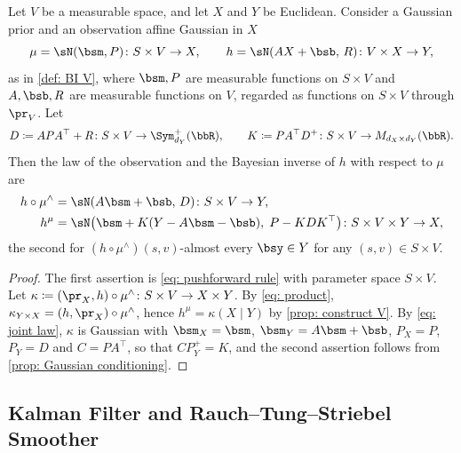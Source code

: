 \documentclass[12pt,reqno]{amsart}%
\theoremstyle{plain}
\theoremstyle{definition}
\def\R{\bbR}
\begin{document}
\begin{corollary}\label{cor: Gaussian BI}
	Let $V$ be a measurable space, and let $X$ and $Y$ be Euclidean.
	Consider a Gaussian prior and an observation affine Gaussian in $X$
	\[
		\mu=\sN(\bsm,P)\colon S\times V\rightarrow X,\qquad
		h=\sN(AX+\bsb,\,R)\colon V\times X\rightarrow Y,
	\]
	as in \cref{def: BI V}, where $\bsm,P$ are measurable functions on $S\times V$
	and $A,\bsb,R$ are measurable functions on $V$, regarded as functions on $S\times V$ through $\pr_V$.
	Let
	\[
		D\coloneqq APA^{\top}+R\colon S\times V\rightarrow\Sym^+_{d_Y}(\R),\qquad
		K\coloneqq PA^{\top}D^+\colon S\times V\rightarrow M_{d_X\times d_Y}(\R).
	\]
	Then the law of the observation and the Bayesian inverse of $h$ with respect to $\mu$ are
	\begin{align*}
		h\circ\mu^\wedge&=\sN(A\bsm+\bsb,\,D)\colon S\times V\rightarrow Y,\\
		h^\mu&=\sN\bigl(\bsm+K(Y-A\bsm-\bsb),\;P-KDK^{\top}\bigr)\colon S\times V\times Y\rightarrow X,
	\end{align*}
	the second for $(h\circ\mu^\wedge)(s,v)$-almost every $\bsy\in Y$ for any $(s,v)\in S\times V$.
\end{corollary}

\begin{proof}
	The first assertion is \eqref{eq: pushforward rule} with parameter space $S\times V$.
	Let $\kappa\coloneqq(\pr_X,h)\circ\mu^\wedge\colon S\times V\rightarrow X\times Y$.
	By \eqref{eq: product}, $\kappa_{Y\times X}=(h,\pr_X)\circ\mu^\wedge$, hence $h^\mu=\kappa(X\mid Y)$ by \cref{prop: construct V}.
	By \eqref{eq: joint law}, $\kappa$ is Gaussian with $\bsm_X=\bsm$, $\bsm_Y=A\bsm+\bsb$, $P_X=P$, $P_Y=D$ and
	$C=PA^{\top}$, so that $CP_Y^+=K$, and the second assertion follows from \cref{prop: Gaussian conditioning}.
\end{proof}

%
\subsection{Kalman Filter and Rauch--Tung--Striebel Smoother}
%
\end{document}
